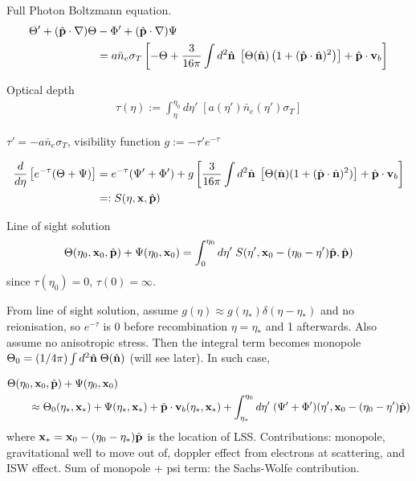 Full Photon Boltzmann equation.
\begin{align}
	\Theta' + (\hat{\mathbf{p}} \cdot \nabla) \Theta &- \Phi' +(\hat{\mathbf{p}} \cdot \nabla) \Psi  \nonumber \\	
	&= a \bar{n}_e \sigma_T \left[ -\Theta + \frac{3}{16\pi} \int d^2 \hat{\mathbf{n}} \; \left[ \Theta(\hat{\mathbf{n}}) \left( 1 + (\hat{\mathbf{p}} \cdot \hat{\mathbf{n}})^2 \right) \right] + \hat{\mathbf{p}} \cdot \mathbf{v}_b \right] 
\end{align}

Optical depth
\begin{align}
	\tau(\eta) := \int_\eta^{\eta_0} d\eta'\; \left[ a(\eta') \bar{n}_e (\eta') \sigma_T \right]
\end{align}

$\tau' = -a \bar{n}_e \sigma_T$, visibility function $g:=-\tau'e^{-\tau}$

\begin{align}
	\frac{d}{d\eta} \left[ e^{-\tau} (\Theta + \Psi) \right] &= e^{-\tau}(\Psi' + \Phi') + g \left[ \frac{3}{16\pi} \int d^2\hat{\mathbf{n}} \; \left[ \Theta(\hat{\mathbf{n}}) (1 + (\hat{\mathbf{p}} \cdot \hat{\mathbf{n}})^2) \right] + \hat{\mathbf{p}} \cdot \mathbf{v}_b \right] \\
	&=: S(\eta, \mathbf{x}, \hat{\mathbf{p}})
\end{align}

Line of sight solution
\begin{align}
	\Theta(\eta_0, \mathbf{x}_0, \hat{\mathbf{p}}) + \Psi(\eta_0, \mathbf{x}_0) = \int_0^{\eta_0} d\eta' \; S(\eta', \mathbf{x}_0 - (\eta_0 -\eta') \hat{\mathbf{p}}, \hat{\mathbf{p}})
\end{align}
since $\tau(\eta_0)=0$, $\tau(0) = \infty$.

From line of sight solution, assume $g(\eta)\approx g(\eta_*)\delta(\eta-\eta_*)$ and no reionisation, so $e^{-\tau}$ is 0 before recombination $\eta=\eta_*$ and 1 afterwards. Also assume no anisotropic stress. Then the integral term becomes monopole $\Theta_0 = (1/4\pi)\int d^2\hat{\mathbf{n}} \;\Theta(\hat{\mathbf{n}})$ (will see later). In such case,

\begin{align}
	&\Theta(\eta_0, \mathbf{x}_0, \hat{\mathbf{p}}) + \Psi(\eta_0, \mathbf{x}_0) \nonumber \\
	&\qquad \approx \Theta_0(\eta_*, \mathbf{x}_*) + \Psi(\eta_*, \mathbf{x}_*) + \hat{\mathbf{p}}\cdot \mathbf{v}_b (\eta_*, \mathbf{x}_*) + \int_{\eta_*}^{\eta_0} d\eta' \; (\Psi' + \Phi')(\eta', \mathbf{x}_0-(\eta_0-\eta')\hat{\mathbf{p}}) 
\end{align}
where $\mathbf{x}_* = \mathbf{x}_0-(\eta_0-\eta_*)\hat{\mathbf{p}}$ is the location of LSS. Contributions: monopole, gravitational well to move out of, doppler effect from electrons at scattering, and ISW effect. Sum of monopole + psi term: the Sachs-Wolfe contribution.


